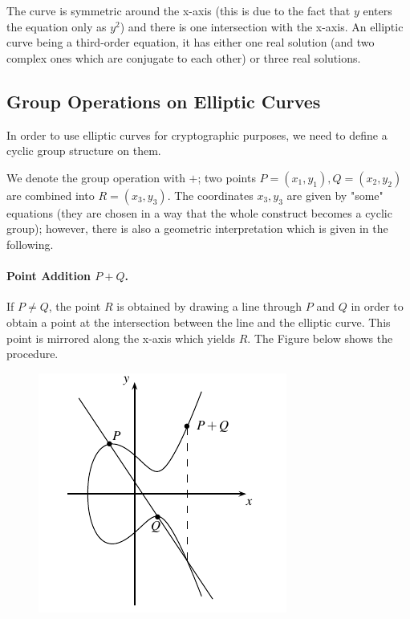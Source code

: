 The curve is symmetric around the x-axis (this is due to the fact that $y$ enters the equation only as $y^2$) and there is one intersection with the x-axis. An elliptic curve being a third-order equation, it has either one real solution (and two complex ones which are conjugate to each other) or three real solutions.

\subsection{Group Operations on Elliptic Curves}

In order to use elliptic curves for cryptographic purposes, we need to define a cyclic group structure on them. 

We denote the group operation with $+$; two points $P=(x_1, y_1), Q=(x_2, y_2)$ are combined into $R=(x_3, y_3)$. The coordinates $x_3, y_3$ are given by "some" equations (they are chosen in a way that the whole construct becomes a cyclic group); however, there is also a geometric interpretation which is given in the following.

\paragraph{Point Addition $P+Q$.} If $P\neq Q$, the point $R$ is obtained by drawing a line through $P$ and $Q$ in order to obtain a point at the intersection between the line and the elliptic curve. This point is mirrored along the x-axis which yields $R$. The Figure below shows the procedure.

\begin{figure}[H]
	\includegraphics[scale=1.0]{images/elliptic_curves_groupop_1.png}
\end{figure}

